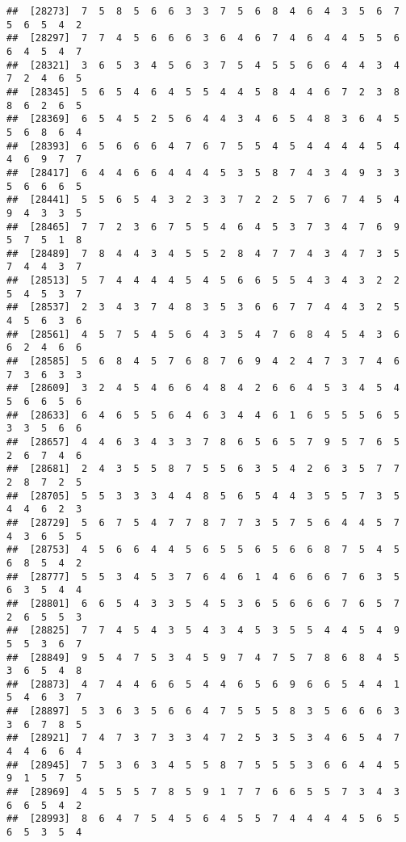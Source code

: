 \documentclass[
]{book}
\begin{document}
\begin{verbatim}
##  [28273]  7  5  8  5  6  6  3  3  7  5  6  8  4  6  4  3  5  6  7  5  6  5  4  2
##  [28297]  7  7  4  5  6  6  6  3  6  4  6  7  4  6  4  4  5  5  6  6  4  5  4  7
##  [28321]  3  6  5  3  4  5  6  3  7  5  4  5  5  6  6  4  4  3  4  7  2  4  6  5
##  [28345]  5  6  5  4  6  4  5  5  4  4  5  8  4  4  6  7  2  3  8  8  6  2  6  5
##  [28369]  6  5  4  5  2  5  6  4  4  3  4  6  5  4  8  3  6  4  5  5  6  8  6  4
##  [28393]  6  5  6  6  6  4  7  6  7  5  5  4  5  4  4  4  4  5  4  4  6  9  7  7
##  [28417]  6  4  4  6  6  4  4  4  5  3  5  8  7  4  3  4  9  3  3  5  6  6  6  5
##  [28441]  5  5  6  5  4  3  2  3  3  7  2  2  5  7  6  7  4  5  4  9  4  3  3  5
##  [28465]  7  7  2  3  6  7  5  5  4  6  4  5  3  7  3  4  7  6  9  5  7  5  1  8
##  [28489]  7  8  4  4  3  4  5  5  2  8  4  7  7  4  3  4  7  3  5  7  4  4  3  7
##  [28513]  5  7  4  4  4  4  5  4  5  6  6  5  5  4  3  4  3  2  2  5  4  5  3  7
##  [28537]  2  3  4  3  7  4  8  3  5  3  6  6  7  7  4  4  3  2  5  4  5  6  3  6
##  [28561]  4  5  7  5  4  5  6  4  3  5  4  7  6  8  4  5  4  3  6  6  2  4  6  6
##  [28585]  5  6  8  4  5  7  6  8  7  6  9  4  2  4  7  3  7  4  6  7  3  6  3  3
##  [28609]  3  2  4  5  4  6  6  4  8  4  2  6  6  4  5  3  4  5  4  5  6  6  5  6
##  [28633]  6  4  6  5  5  6  4  6  3  4  4  6  1  6  5  5  5  6  5  3  3  5  6  6
##  [28657]  4  4  6  3  4  3  3  7  8  6  5  6  5  7  9  5  7  6  5  2  6  7  4  6
##  [28681]  2  4  3  5  5  8  7  5  5  6  3  5  4  2  6  3  5  7  7  2  8  7  2  5
##  [28705]  5  5  3  3  3  4  4  8  5  6  5  4  4  3  5  5  7  3  5  4  4  6  2  3
##  [28729]  5  6  7  5  4  7  7  8  7  7  3  5  7  5  6  4  4  5  7  4  3  6  5  5
##  [28753]  4  5  6  6  4  4  5  6  5  5  6  5  6  6  8  7  5  4  5  6  8  5  4  2
##  [28777]  5  5  3  4  5  3  7  6  4  6  1  4  6  6  6  7  6  3  5  6  3  5  4  4
##  [28801]  6  6  5  4  3  3  5  4  5  3  6  5  6  6  6  7  6  5  7  2  6  5  5  3
##  [28825]  7  7  4  5  4  3  5  4  3  4  5  3  5  5  4  4  5  4  9  5  5  3  6  7
##  [28849]  9  5  4  7  5  3  4  5  9  7  4  7  5  7  8  6  8  4  5  3  6  5  4  8
##  [28873]  4  7  4  4  6  6  5  4  4  6  5  6  9  6  6  5  4  4  1  5  4  6  3  7
##  [28897]  5  3  6  3  5  6  6  4  7  5  5  5  8  3  5  6  6  6  3  3  6  7  8  5
##  [28921]  7  4  7  3  7  3  3  4  7  2  5  3  5  3  4  6  5  4  7  4  4  6  6  4
##  [28945]  7  5  3  6  3  4  5  5  8  7  5  5  5  3  6  6  4  4  5  9  1  5  7  5
##  [28969]  4  5  5  5  7  8  5  9  1  7  7  6  6  5  5  7  3  4  3  6  6  5  4  2
##  [28993]  8  6  4  7  5  4  5  6  4  5  5  7  4  4  4  4  5  6  5  6  5  3  5  4

\end{verbatim}
\end{document}
